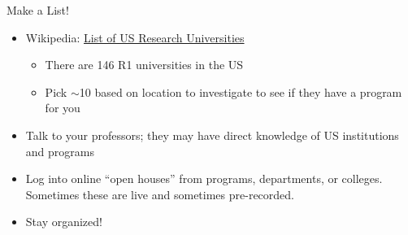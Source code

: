 \begin{frame}[fragile]{Make a List!}
\begin{itemize}
    \item Wikipedia: \href{https://en.wikipedia.org/wiki/List_of_research_universities_in_the_United_States}{List of US Research Universities}
    \begin{itemize}
        \item There are 146 R1 universities in the US
        \item Pick $\sim$10 based on location to investigate to see if they have a program for you
    \end{itemize}
    \item Talk to your professors; they may have direct knowledge of US institutions and programs
    \item Log into online ``open houses'' from programs, departments, or colleges.  Sometimes these are live and sometimes pre-recorded.
    \item Stay organized!  
\end{itemize}
\end{frame}

